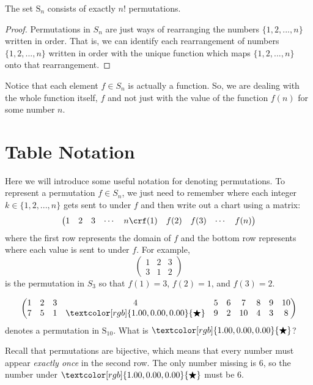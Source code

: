 \documentclass[11pt,dvipsnames]{book}
\numberwithin{figure}{section} %
\numberwithin{table}{section} %
\begin{document}
\begin{lemma}%
 The set $\mathrm{S}_n$ consists of exactly $n!$ permutations.
\end{lemma}
\begin{proof}
Permutations in $S_{n}$ are just ways of rearranging the numbers $\{1,2,...,n\}$ written in order. That is, we can identify each rearrangement of numbers $\{1,2,...,n\}$ written in order with the unique function which maps $\{1,2,...,n\}$ onto that rearrangement. 
\end{proof}

Notice that each element $f\in S_{n}$ is actually a function.
So, we are dealing with the whole function itself, \(f\) and not just with the value of the function \(f(n)\) for some number \(n\).

\section{Table Notation}%
\label{tablenotation}

Here we will introduce some useful notation for denoting permutations. To represent a permutation $f\in S_n$,  we just need to remember where each integer $k\in \{1,2,...,n\}$ gets sent to under $f$ and then write out a chart using a matrix:
 $$
\left(\begin{matrix} %
1 & 2 & 3 & \cdots & n \cr%
f(1) & f(2) & f(3) & \cdots & f(n) \cr%
\end{matrix}\right)
$$
where the first row represents the domain of $f$ and the bottom row represents where each value is sent to under $f$. For example,
 $$
\left(\begin{matrix} %
1 & 2 & 3  \\
3 & 1 & 2
\end{matrix}\right)
$$
is the permutation in $S_{3}$ so that $f(1)=3$, $f(2)=1$, and $f(3)=2$. 

\begin{exercise}
$$
\left(\begin{matrix} %
1 & 2 & 3 & 4 & 5 & 6 & 7  & 8 & 9 & 10 \cr%
7 & 5 & 1 & \textcolor[rgb]{1.00,0.00,0.00}{\bigstar} & 9 & 2 & 10 & 4 & 3 & 8\cr%
\end{matrix}\right)
$$
denotes a permutation in $\mathrm{S}_{10}$.  What is
$\textcolor[rgb]{1.00,0.00,0.00}{\bigstar}$?

\begin{solution}
Recall that permutations are bijective, which means that every number must appear \emph{exactly once} in the second row. The only number missing is $6$, so the number under $\textcolor[rgb]{1.00,0.00,0.00}{\bigstar}$ must be 6. 
\end{solution}
\end{exercise}
\end{document}
